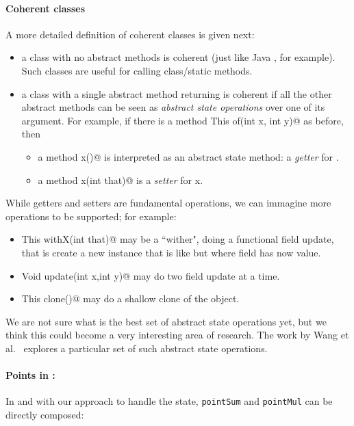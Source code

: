 \paragraph*{Coherent classes} A more detailed definition of coherent
classes is given next:
\begin{itemize}
\item a class with no abstract methods is coherent (just like Java
  \Q@Math@, for example). Such classes are useful for calling class/static methods.
\item a class with a single abstract \Q@class@ method returning \Q@This@
is coherent if all the other abstract methods can be seen as \emph{abstract state
operations} over one of its argument.
For example,
if there is a \Q@class method This of(int x, int y)@ as before,
then
\begin{itemize}
\item a method \Q@int x()@ is interpreted as an abstract state method: a \emph{getter} for \Q@x@.
\item a method \Q@Void x(int that)@ is a \emph{setter} for x.
\end{itemize}
\end{itemize}

While getters and setters are fundamental operations, we can immagine
more operations to be supported; for example:
\begin{itemize}
\item \Q@method This withX(int that)@
may be a ``wither", doing a functional field update, that is create a new instance that is like \Q@this@ but where field \Q@x@ has now \Q@that@ value.
\item \Q@method Void update(int x,int y)@
may do two field update at a time.
\item\Q@method This clone()@ may do a shallow clone of the object.
\end{itemize}

We are not sure what is the best set of abstract state operations yet,
but we think this could become a very interesting area of research.
The work by Wang et al.~\cite{wang2016classless} explores a particular
set of such abstract state operations.

\paragraph{Points in \name:}
In \name and with our approach to handle the state, 
\lstinline{pointSum} and \lstinline{pointMul} can be directly composed:

